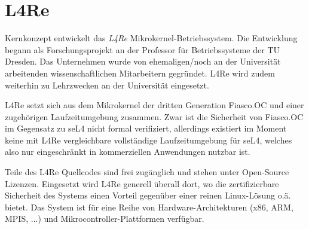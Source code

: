 \section{L4Re}
\label{sec:l4re}

Kernkonzept entwickelt das \textit{L4Re} Mikrokernel-Betriebssystem.
Die Entwicklung begann als Forschungsprojekt an der Professor für
Betriebssysteme der TU Dresden. Das Unternehmen wurde von ehemaligen/noch an
der Universität arbeitenden wissenschaftlichen Mitarbeitern gegründet. L4Re
wird zudem weiterhin zu Lehrzwecken an der Universität eingesetzt.

L4Re setzt sich aus dem Mikrokernel der dritten Generation Fiasco.OC und einer
zugehörigen Laufzeitumgebung zusammen. Zwar ist die Sicherheit von Fiasco.OC im
Gegensatz zu seL4 nicht formal verifiziert, allerdings existiert im Moment
keine mit L4Re vergleichbare vollständige Laufzeitumgebung für seL4, welches
also nur eingeschränkt in kommerziellen Anwendungen nutzbar ist.

Teile des L4Re Quellcodes sind frei zugänglich und stehen unter Open-Source
Lizenzen. Eingesetzt wird L4Re generell überall dort, wo die zertifizierbare
Sicherheit des Systems einen Vorteil gegenüber einer reinen Linux-Lösung o.ä.
bietet. Das System ist für eine Reihe von Hardware-Architekturen (x86, ARM,
MPIS, ...) und Mikrocontroller-Plattformen verfügbar.
